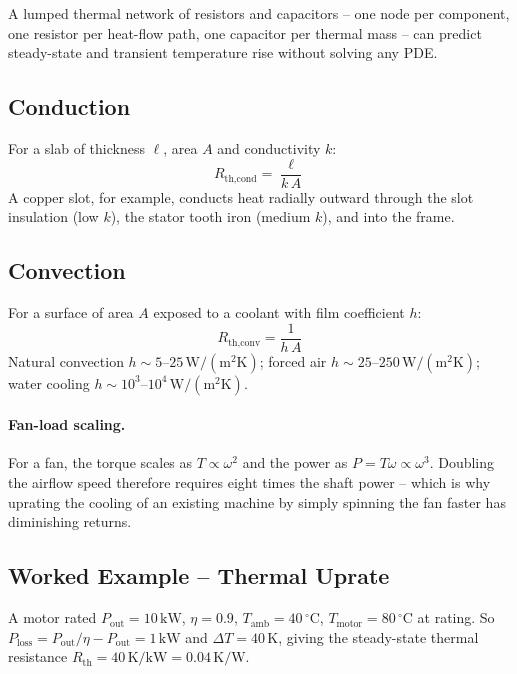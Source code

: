 \documentclass[12pt,a4paper]{article}
\newcommand{\unit}[1]{\ensuremath{\,\mathrm{#1}}}
\newcommand{\degree}{\ensuremath{^{\circ}}}
\begin{document}
A lumped thermal network of resistors and capacitors -- one node per
component, one resistor per heat-flow path, one capacitor per thermal
mass -- can predict steady-state and transient temperature rise
without solving any PDE.

\subsection{Conduction}

For a slab of thickness $\ell$, area $A$ and conductivity $k$:
\begin{equation}
  R_\text{th,cond} = \frac{\ell}{k\,A}
\end{equation}
A copper slot, for example, conducts heat radially outward through the
slot insulation (low $k$), the stator tooth iron (medium $k$), and
into the frame.

\subsection{Convection}

For a surface of area $A$ exposed to a coolant with film coefficient
$h$:
\begin{equation}
  R_\text{th,conv} = \frac{1}{h\,A}
\end{equation}
Natural convection $h\sim 5$--$25\unit{W/(m^2K)}$;
forced air $h\sim 25$--$250\unit{W/(m^2K)}$;
water cooling $h\sim 10^3$--$10^4\unit{W/(m^2K)}$.

\paragraph{Fan-load scaling.}
For a fan, the torque scales as $T\propto\omega^2$ and the power as
$P=T\omega\propto\omega^3$. Doubling the airflow speed therefore
requires eight times the shaft power -- which is why uprating the
cooling of an existing machine by simply spinning the fan faster has
diminishing returns.

\subsection{Worked Example -- Thermal Uprate}

A motor rated $P_\text{out} = 10\unit{kW}$, $\eta = 0.9$,
$T_\text{amb} = 40\unit{\degree C}$, $T_\text{motor} = 80\unit{\degree C}$
at rating. So $P_\text{loss} = P_\text{out}/\eta - P_\text{out} =
1\unit{kW}$ and $\Delta T = 40\unit{K}$, giving the steady-state
thermal resistance $R_\text{th} = 40\unit{K/kW} = 0.04\unit{K/W}$.
\end{document}
